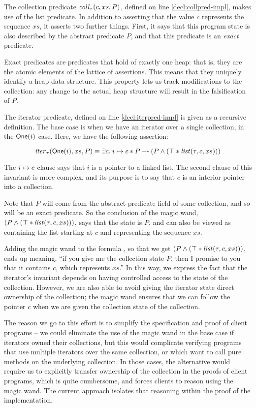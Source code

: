 The collection predicate $\mathit{coll}_\tau(c, xs, P)$, defined on line
\ref{decl:collpred-impl}, makes use of the list predicate. In addition
to asserting that the value $c$ represents the sequence $xs$, it
asserts two further things. First, it says that this program state is
also described by the abstract predicate $P$, and that this predicate
is an \emph{exact} predicate.

Exact predicates are predicates that hold of exactly one heap: that
is, they are the atomic elements of the lattice of assertions. This
means that they uniquely identify a heap data structure. This property
lets us track modifications to the collection: any change to the actual
heap structure will result in the falsification of $P$.  

The iterator predicate, defined on line \ref{decl:iterpred-impl} is 
given as a recursive definition. The base case is when we have an 
iterator over a single collection, in the $\mathsf{One}(i)$ case.  Here, 
we have the following assertion: 

\begin{displaymath}
  \mathit{iter}_\tau(\mathsf{One}(i), xs, P) \equiv 
    \exists c.\; i \mapsto c * P -\!\!*\, (P \land (\top * \mathit{list}(\tau, c, xs)))
\end{displaymath}

The $i \mapsto c$ clause says that $i$ is a pointer to a linked
list.  The second clause of this invariant is more complex, and its
purpose is to say that $c$ is an interior pointer into a collection.

Note that $P$ will come from the abstract predicate field of some
collection, and so will be an exact predicate. So the conclusion 
of the magic wand, $(P \land (\top * \mathit{list}(\tau, c, xs)))$, says
that the state is $P$, and can also be viewed as containing the 
list starting at $c$ and representing the sequence $xs$. 

Adding the magic wand to the formula , so that we get $(P \land (\top
* \mathit{list}(\tau, c, xs)))$, ends up meaning, ``if you give me the
collection state $P$, then I promise to you that it contains $c$,
which represents $xs$.'' In this way, we express the fact that the
iterator's invariant depends on having controlled access to the state
of the collection. However, we are also able to avoid giving the
iterator state direct ownership of the collection; the magic wand
ensures that we can follow the pointer $c$ when we are given the
collection state of the collection.

The reason we go to this effort is to simplify the specification and
proof of client programs -- we could eliminate the use of the magic
wand in the base case if iterators owned their collections, but this
would complicate verifying programs that use multiple iterators over
the same collection, or which want to call pure methods on the
underlying collection. In those cases, the alternative would require
us to explicitly transfer ownership of the collection in the proofs of
client programs, which is quite cumbersome, and forces clients to
reason using the magic wand. The current approach isolates that
reasoning within the proof of the implementation.


